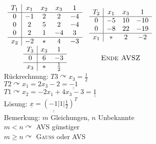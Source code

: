 \documentclass[a4paper]{scrartcl}
\begin{document}
$
\begin{array}{cc}
\begin{array}{c|cccc}
T_1 & x_1 & x_2 & x_3 & 1\\ \hline
0 & -1 & 2 & 2 & -4 \\
0 & 2 & 5 & 2 & -4\\
0 & 2 & 1 & -4 & 3 \\ \hline
x_2 & -2 & * & 4 & -3\\
\end{array}
&
\begin{array}{c|ccc}
T_2 & x_1 & x_3 & 1\\ \hline
0 & -5 & 10 & -10 \\
0 & -8 & 22 & -19\\ \hline
x_1 & * & 2 & -2\\ 
\end{array} \\
\begin{array}{c|cc}
T_3 & x_3 & 1\\ \hline
0 & 6 & -3 \\ \hline
x_3 & * & \frac{1}{2} \\ 
\end{array} & \text{\textsc{Ende AVSZ}}\\
\end{array}$\\
Rückrechnung: $T3 \curvearrowright x_3 = \frac{1}{2}$\\
$T2 \curvearrowright x_1 = 2x_3 -2 = \underline{\underline{-1}}$\\
$T1 \curvearrowright x_2 = -2x_1 + 4x_3 -3 = \underline{\underline{1}}$\\
Lösung: $\underline{\underline{\underline{x} = (-1 | 1 | \frac{1}{2} )^T}}$\\
Bemerkung: $m$ Gleichungen, $n$ Unbekannte\\
$m<n \curvearrowright$ \textsc{AVS} günstiger\\
$m \geq n \curvearrowright$ \textsc{Gauss} oder \textsc{AVS}
\end{document}

